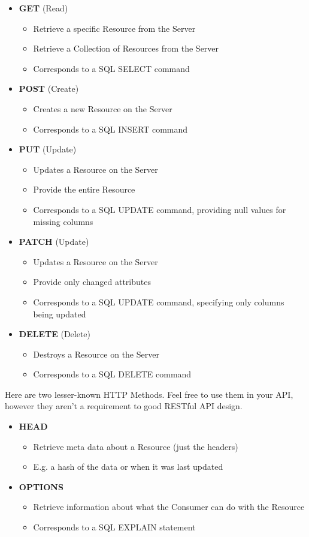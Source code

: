 \documentclass{book}
\begin{document}
\begin{itemize}
\item \textbf{GET} (Read)
    \begin{itemize}
    \item Retrieve a specific Resource from the Server
    \item Retrieve a Collection of Resources from the Server
    \item Corresponds to a SQL SELECT command
    \end{itemize}
\item \textbf{POST} (Create)
    \begin{itemize}
    \item Creates a new Resource on the Server
    \item Corresponds to a SQL INSERT command
    \end{itemize}
\item \textbf{PUT} (Update)
    \begin{itemize}
    \item Updates a Resource on the Server
    \item Provide the entire Resource
    \item Corresponds to a SQL UPDATE command, providing null values for missing columns
    \end{itemize}
\item \textbf{PATCH} (Update)
    \begin{itemize}
    \item Updates a Resource on the Server
    \item Provide only changed attributes
    \item Corresponds to a SQL UPDATE command, specifying only columns being updated
    \end{itemize}
\item \textbf{DELETE} (Delete)
    \begin{itemize}
    \item Destroys a Resource on the Server
    \item Corresponds to a SQL DELETE command
    \end{itemize}
\end{itemize}

Here are two lesser-known HTTP Methods. Feel free to use them in your API, however they aren't a requirement to good RESTful API design.

\begin{itemize}
\item \textbf{HEAD}
    \begin{itemize}
    \item Retrieve meta data about a Resource (just the headers)
    \item E.g. a hash of the data or when it was last updated
    \end{itemize}
\item \textbf{OPTIONS}
    \begin{itemize}
    \item Retrieve information about what the Consumer can do with the Resource
    \item Corresponds to a SQL EXPLAIN statement
    \end{itemize}
\end{itemize}
\end{document}
